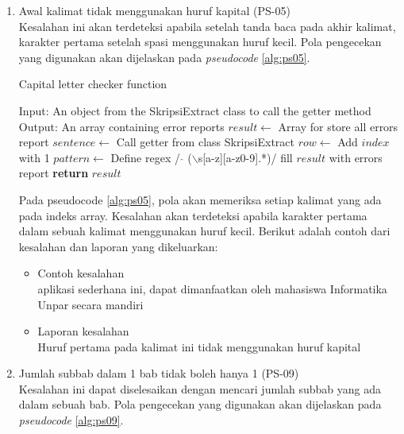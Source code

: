 \begin{enumerate}
	\item Awal kalimat tidak menggunakan huruf kapital (PS-05) \\
	Kesalahan ini akan terdeteksi apabila setelah tanda baca pada akhir kalimat, karakter pertama setelah spasi menggunakan huruf kecil. Pola pengecekan yang digunakan akan dijelaskan pada \textit{pseudocode} \ref{alg:ps05}.

\begin{minipage}{1.0\linewidth}
\begin{algorithm}[H]
    \caption{Capital letter checker function}
	\label{alg:ps05}
	\begin{algorithmic}[1]
    		\State Input: An object from the SkripsiExtract class to call the getter method
			\State Output: An array containing error reports
			\State $result \gets$ Array for store all errors report
			\State $sentence \gets$ Call getter from class SkripsiExtract
    			\State $row \gets$ Add $index$ with 1
				\State $pattern \gets$ Define regex / $\hat{}$ ($\backslash$s[a-z][a-z0-9].*)/
                	\State fill $result$ with errors report
            	\EndIf
        	\EndFor
    		\State \textbf{return} $result$
    	\EndFunction
	\end{algorithmic}
\end{algorithm}
\end{minipage}
\medskip

	Pada pseudocode \ref{alg:ps05}, pola akan memeriksa setiap kalimat yang ada pada indeks array. Kesalahan akan terdeteksi apabila karakter pertama dalam sebuah kalimat menggunakan huruf kecil. Berikut adalah contoh dari kesalahan dan laporan yang dikeluarkan:
	
	\begin{itemize}
		\item Contoh kesalahan \\ 
		aplikasi sederhana ini, dapat dimanfaatkan oleh mahasiswa Informatika Unpar secara mandiri
		\item Laporan kesalahan \\
		Huruf pertama pada kalimat ini tidak menggunakan huruf kapital
	\end{itemize}
	
	\item Jumlah subbab dalam 1 bab tidak boleh hanya 1 (PS-09) \\
	Kesalahan ini dapat diselesaikan dengan mencari jumlah subbab yang ada dalam sebuah bab. Pola pengecekan yang digunakan akan dijelaskan pada \textit{pseudocode} \ref{alg:ps09}.


\end{enumerate}
